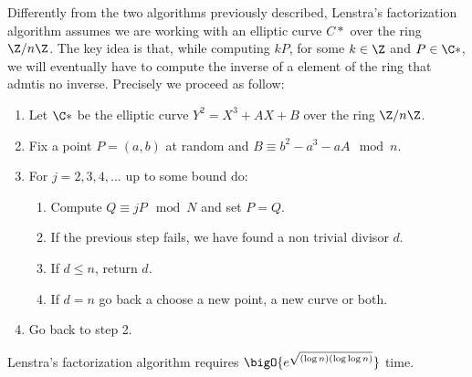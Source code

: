 \documentclass{subfiles}
\begin{document}
    Differently from the two algorithms previously described, 
        Lenstra's factorization algorithm assumes we are working with an elliptic curve \(C*\)
        over the ring \(\Z / n\Z\).
        The key idea is that, while computing \(kP\), for some \(k \in \Z\) and \(P \in \C*\),
        we will eventually have to compute the inverse of a element of the ring that admtis no inverse.
        Precisely we proceed as follow:
        \begin{enumerate}
            \item Let \(\C*\) be the elliptic curve \(Y^{2} = X^{3} + AX + B\)
                over the ring \(\Z/n\Z\).

            \item Fix a point \(P = (a, b)\) at random and \(B \equiv b^{2} - a^{3} - aA \mod{n}\).

            \item For \(j = 2, 3, 4, \ldots\)  up to some bound do:
                \begin{enumerate}
                    \item Compute \(Q \equiv jP \mod{N}\) and set \(P = Q\).
                    \item If the previous step fails, we have found a non trivial divisor \(d\).
                    \item If \(d \le n\), return \(d\).
                    \item If \(d = n\) go back a choose a new point, a new curve or both.
                \end{enumerate}
            \item Go back to step 2.
        \end{enumerate}

    Lenstra's factorization algorithm requires \(\bigO{e^{\sqrt{(\log n)(\log\log n)}}}\)
    time.
\end{document}
